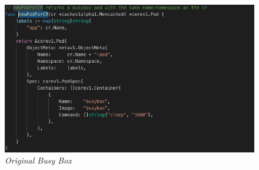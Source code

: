 \begin{figure}[!ht]
\centering
\includegraphics*[width=1\textwidth]{images/con1.png}
\caption{\em Original Busy Box}
\label{img:con1}
\end{figure}

